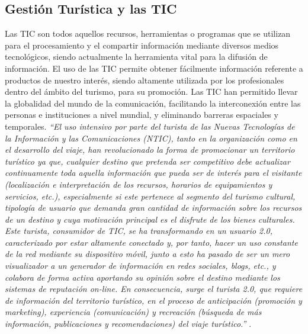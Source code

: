 \documentclass[12pt,letterpaper,openany]{book}
\begin{document}
\subsection{Gestión Turística y las TIC}
Las TIC son todos aquellos recursos, herramientas o programas que se utilizan para el procesamiento y el compartir información mediante diversos medios tecnológicos, siendo actualmente la herramienta vital para la difusión de información.
El uso de las TIC permite obtener fácilmente información referente a productos de nuestro interés, siendo altamente utilizada por los profesionales dentro del ámbito del turismo, para su promoción.
\vspace{5mm}\newline
Las TIC han permitido llevar la globalidad del mundo de la comunicación, facilitando la interconexión entre las personas e instituciones a nivel mundial, y eliminando barreras espaciales y temporales. 
\vspace{5mm}\newline
\textit{“El uso intensivo por parte del turista de las Nuevas Tecnologías de la Información y las Comunicaciones (NTIC), tanto en la organización como en el desarrollo del viaje, han revolucionado la forma de promocionar un territorio turístico ya que, cualquier destino que pretenda ser competitivo debe actualizar continuamente toda aquella información que pueda ser de interés para el visitante (localización e interpretación de los recursos, horarios de equipamientos y servicios, etc.), especialmente si este pertenece al segmento del turismo cultural, tipología de usuario que demanda gran cantidad de información sobre los recursos de un destino y cuya motivación principal es el disfrute de los bienes culturales.
Este turista, consumidor de TIC, se ha transformando en un usuario 2.0, caracterizado por estar altamente conectado y, por tanto, hacer un uso constante de la red mediante su dispositivo móvil, junto a esto ha pasado de ser un mero visualizador a un generador de información en redes sociales, blogs, etc., y colabora de forma activa aportando su opinión sobre el destino mediante los sistemas de reputación on-line. En consecuencia, surge el turista 2.0, que requiere de información del territorio turístico, en el proceso de anticipación (promoción y marketing), experiencia (comunicación) y recreación (búsqueda de más información, publicaciones y recomendaciones) del viaje turístico.”} \cite{9}.
\end{document}
